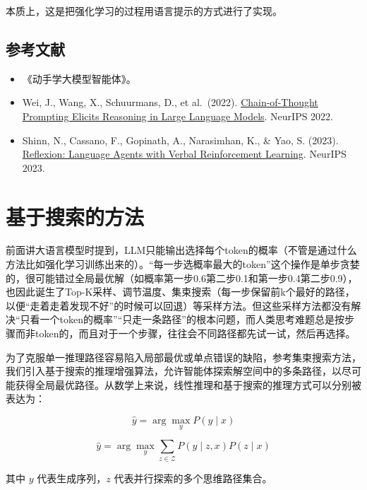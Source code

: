 本质上，这是把强化学习的过程用语言提示的方式进行了实现。

\hypertarget{ux53c2ux8003ux6587ux732e-123}{%
\subsection{参考文献}\label{ux53c2ux8003ux6587ux732e-123}}

\begin{itemize}
\tightlist
\item
  《动手学大模型智能体》。
\item
  Wei, J., Wang, X., Schuurmans, D., et al.~(2022). \href{https://arxiv.org/abs/2201.11903}{Chain-of-Thought Prompting Elicits Reasoning in Large Language Models}. NeurIPS 2022.
\item
  Shinn, N., Cassano, F., Gopinath, A., Narasimhan, K., \& Yao, S. (2023). \href{https://arxiv.org/abs/2303.11366}{Reflexion: Language Agents with Verbal Reinforcement Learning}. NeurIPS 2023.
\end{itemize}

\clearpage

\hypertarget{ux57faux4e8eux641cux7d22ux7684ux65b9ux6cd5}{%
\section{基于搜索的方法}\label{ux57faux4e8eux641cux7d22ux7684ux65b9ux6cd5}}

前面讲大语言模型时提到，LLM只能输出选择每个token的概率（不管是通过什么方法比如强化学习训练出来的）。``每一步选概率最大的token''这个操作是单步贪婪的，很可能错过全局最优解（如概率第一步0.6第二步0.1和第一步0.4第二步0.9），也因此诞生了Top-K采样、调节温度、集束搜索（每一步保留前k个最好的路径，以便``走着走着发现不好''的时候可以回退）等采样方法。但这些采样方法都没有解决``只看一个token的概率''``只走一条路径''的根本问题，而人类思考难题总是按步骤而非token的，而且对于一个步骤，往往会不同路径都先试一试，然后再选择。

为了克服单一推理路径容易陷入局部最优或单点错误的缺陷，参考集束搜索方法，我们引入基于搜索的推理增强算法，允许智能体探索解空间中的多条路径，以尽可能获得全局最优路径。从数学上来说，线性推理和基于搜索的推理方式可以分别被表达为：

\[
\hat{y}=\arg\max_y P(y\mid x)
\]

\[
\hat{y}=\arg\max_y \sum_{z\in \mathcal{Z}}P(y\mid z,x)P(z\mid x)
\]

其中 \(y\) 代表生成序列，\(z\) 代表并行探索的多个思维路径集合。

